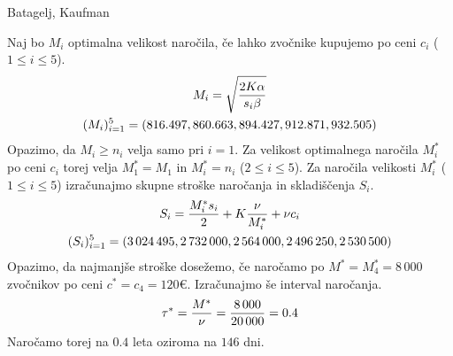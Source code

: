 \begin{naloga}{Batagelj, Kaufman}{\cite[Naloga~10.7]{bk}}
\begin{odgovor}
Naj bo $M_i$ optimalna velikost naročila,
če lahko zvočnike kupujemo po ceni $c_i$ ($1 \le i \le 5$).
\begin{gather*}
M_i = \sqrt{2K \alpha \over s_i \beta} \\
(M_i)_{i=1}^5 = (816.497, 860.663, 894.427, 912.871, 932.505)
\end{gather*}
Opazimo, da $M_i \ge n_i$ velja samo pri $i = 1$.
Za velikost optimalnega naročila $M^*_i$ po ceni $c_i$
torej velja $M^*_1 = M_1$ in $M^*_i = n_i$ ($2 \le i \le 5$).
Za naročila velikosti $M^*_i$ ($1 \le i \le 5$)
izračunajmo skupne stroške naročanja in skladiščenja $S_i$.
\begin{gather*}
S_i = {M^*_i s_i \over 2} + K {\nu \over M^*_i} + \nu c_i \\
(S_i)_{i=1}^5 = (3\,024\,495, 2\,732\,000, 2\,564\,000, 2\,496\,250, 2\,530\,500)
\end{gather*}
Opazimo, da najmanjše stroške dosežemo,
če naročamo po $M^* = M^*_4 = 8\,000$ zvočnikov po ceni $c^* = c_4 = 120 €$.
Izračunajmo še interval naročanja.
$$
\tau^* = {M^* \over \nu} = {8\,000 \over 20\,000} = 0.4
$$
Naročamo torej na $0.4$ leta oziroma na $146$ dni.
\end{odgovor}
\end{naloga}
